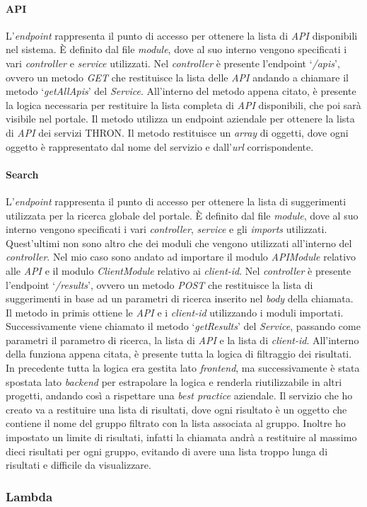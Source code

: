 \paragraph{API}
L'\textit{endpoint} rappresenta il punto di accesso per ottenere la lista di \textit{API} disponibili nel sistema.
È definito dal file \textit{module}, dove al suo interno vengono specificati i vari \textit{controller} e \textit{service} utilizzati.
Nel \textit{controller} è presente l'endpoint `\textit{/apis}', ovvero un metodo \textit{GET} che restituisce la lista delle \textit{API} andando
a chiamare il metodo `\textit{getAllApis}' del \textit{Service}.
All'interno del metodo appena citato, è presente la logica necessaria per restituire la lista completa di \textit{API} disponibili, che poi sarà visibile nel portale.
Il metodo utilizza un endpoint aziendale per ottenere la lista di \textit{API} dei servizi THRON.
Il metodo restituisce un \textit{array} di oggetti, dove ogni oggetto è rappresentato dal nome del servizio e dall'\textit{url} corrispondente.

\paragraph{Search}
L'\textit{endpoint} rappresenta il punto di accesso per ottenere la lista di suggerimenti utilizzata per la ricerca globale del portale.
È definito dal file \textit{module}, dove al suo interno vengono specificati i vari \textit{controller}, \textit{service} e gli \textit{imports} utilizzati. 
Quest'ultimi non sono altro che dei moduli che vengono utilizzati all'interno del \textit{controller}. Nel mio caso sono andato ad importare il modulo \textit{APIModule}
relativo alle \textit{API} e il modulo \textit{ClientModule} relativo ai \textit{client-id}.
Nel \textit{controller} è presente l'endpoint `\textit{/results}', ovvero un metodo \textit{POST} che restituisce la lista di suggerimenti in base ad un parametri di ricerca
inserito nel \textit{body} della chiamata. Il metodo in primis ottiene le \textit{API} e i \textit{client-id} utilizzando i moduli importati. 
Successivamente viene chiamato il metodo `\textit{getResults}' del \textit{Service}, passando come parametri il parametro di ricerca, la lista di \textit{API} e la lista di \textit{client-id}.
All'interno della funziona appena citata, è presente tutta la logica di filtraggio dei risultati. In precedente tutta la logica era gestita lato \textit{frontend}, ma successivamente 
è stata spostata lato \textit{backend} per estrapolare la logica e renderla riutilizzabile in altri progetti, andando così a rispettare una \textit{best practice} aziendale.
Il servizio che ho creato va a restituire una lista di risultati, dove ogni risultato è un oggetto che contiene il nome del gruppo filtrato con la lista associata al gruppo.
Inoltre ho impostato un limite di risultati, infatti la chiamata andrà a restituire al massimo dieci risultati per ogni gruppo, evitando di avere una lista troppo lunga di risultati e difficile 
da visualizzare.

\subsubsection{Lambda}\label{subsubsec:lambda}

